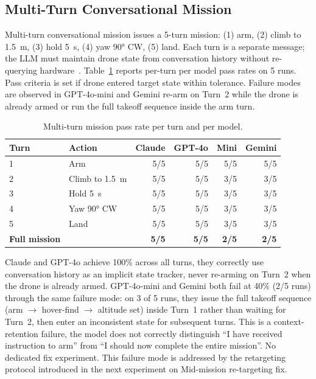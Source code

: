 \subsection{Multi-Turn Conversational Mission}
\label{sec:ch3_c3}

Multi-turn conversational mission issues a 5-turn mission: (1) arm, (2) climb to 1.5~m, (3) hold 5~s, (4) yaw 90° CW, (5) land. 
Each turn is a separate message; the LLM must maintain drone state from conversation history without re-querying
hardware~\cite{huang2022innermonologue}. Table~\ref{tab:ch3_c3} reports per-turn per model pass rates on 5 runs.
Pass criteria is set if drone entered target state within tolerance.
Failure modes are observed in GPT-4o-mini and Gemini re-arm on Turn~2 while the drone is already armed or run the full takeoff sequence inside the arm turn.
\begin{table}[ht]
  \caption{Multi-turn mission pass rate per turn and per model.}
  \label{tab:ch3_c3}
  \centering
  \small
  \begin{tabular}{llrrrr}
    \toprule
    Turn & Action & Claude & GPT-4o & Mini & Gemini \\
    \midrule
    1 & Arm                & 5/5 & 5/5 & 5/5 & 5/5 \\
    2 & Climb to 1.5~m     & 5/5 & 5/5 & 3/5 & 3/5 \\
    3 & Hold 5~s           & 5/5 & 5/5 & 3/5 & 3/5 \\
    4 & Yaw 90° CW         & 5/5 & 5/5 & 3/5 & 3/5 \\
    5 & Land               & 5/5 & 5/5 & 3/5 & 3/5 \\
    \midrule
    \textbf{Full mission}  &    & \textbf{5/5} & \textbf{5/5} & \textbf{2/5} & \textbf{2/5} \\
    \bottomrule
  \end{tabular}
\end{table}

Claude and GPT-4o achieve 100\% across all turns, they correctly use conversation history as an implicit state tracker, never re-arming on Turn~2 when the drone is already armed. 
GPT-4o-mini and Gemini both fail at 40\% (2/5 runs) through the same failure mode: on 3 of 5 runs, they issue the
full takeoff sequence (arm $\to$ hover-find $\to$ altitude set) inside Turn~1 rather than waiting for Turn~2, then enter an inconsistent state for subsequent turns. 
This is a context-retention failure, the model does
not correctly distinguish ``I have received instruction to arm'' from ``I should now complete the entire mission''. No dedicated fix experiment. This failure mode is addressed by the retargeting protocol introduced in the next experiment on Mid-mission re-targeting fix.

